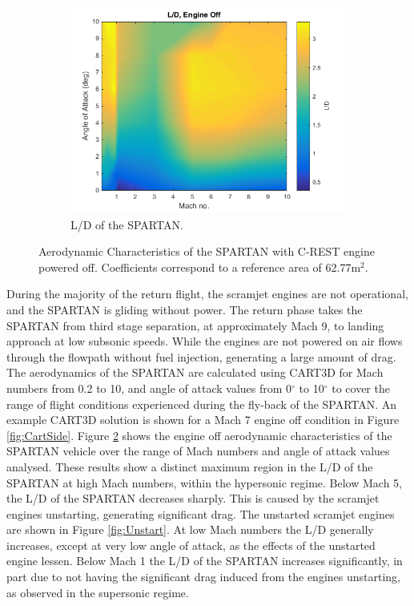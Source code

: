 \begin{figure}[ht]
\begin{subfigure}{.5\textwidth}
		\includegraphics[width=0.99\linewidth]{figures/3_vehicle_design/LD}
		\caption{L/D of the SPARTAN.}
		\label{fig:LD}
	\end{subfigure}
	\caption{Aerodynamic Characteristics of the SPARTAN with C-REST engine powered off. Coefficients correspond to a reference area of 62.77m$^2$.}
	\label{fig:aero1}
\end{figure}

During the majority of the return flight, the scramjet engines are not operational, and the SPARTAN is gliding without power. The return phase takes the SPARTAN from third stage separation, at approximately Mach 9, to landing approach at low subsonic speeds. 
 While the engines are not powered on air flows through the flowpath without fuel injection, generating a large amount of drag. 
The aerodynamics of the SPARTAN are calculated using CART3D for Mach numbers from 0.2 to 10, and angle of attack values from 0$^\circ$ to 10$^\circ$ to cover the range of flight conditions experienced during the fly-back of the SPARTAN.  An example CART3D solution is shown for a Mach 7 engine off condition in Figure  \ref{fig:CartSide}. 
Figure \ref{fig:aero1} shows the engine off aerodynamic characteristics of the SPARTAN vehicle over the range of Mach numbers and angle of attack values analysed.
These results show a distinct maximum region in the L/D of the SPARTAN at high Mach numbers, within the hypersonic regime. Below Mach 5, the L/D of the SPARTAN decreases sharply. This is caused by the scramjet engines unstarting, generating significant drag. The unstarted scramjet engines are shown in Figure \ref{fig:Unstart}. At low Mach numbers the L/D generally increases, except at very low angle of attack, as the effects of the unstarted engine lessen. Below Mach 1 the L/D of the SPARTAN increases significantly, in part due to not having the significant drag induced from the engines unstarting, as observed in the supersonic regime.  


